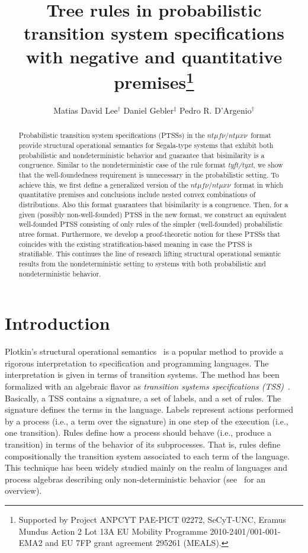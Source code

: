 \documentclass[submission,copyright,creativecommons]{eptcs}
\title{Tree rules in probabilistic transition system specifications with negative and quantitative premises\thanks{Supported by Project ANPCYT PAE-PICT 02272, SeCyT-UNC, 
                 Eramus Mundus Action 2 Lot 13A EU Mobility Programme 2010-2401/001-001-EMA2 and EU 7FP grant agreement 295261 (MEALS).}}
\author{
Matias David Lee$^\dag$  \qquad\qquad
Daniel Gebler$^\ddag$  \qquad\qquad
Pedro R. D'Argenio$^\dag$
\and
\institute{$^\dag$FaMAF -- CONICET \\Universidad Nacional de C\'ordoba\\Ciudad Universitaria, X5000HUA C\'ordoba \\ Argentina}
\email{\{lee,dargenio\}@famaf.unc.edu.ar}
\and
\institute{$^\ddag$Department of Computer Science\\VU University Amsterdam \\ De Boelelaan 1081a, 1081HV Amsterdam \\ The Netherlands}
\email{e.d.gebler@vu.nl}
\ifdraft
\and\institute{\wipinfo}
\fi
}
\newcommand{\ntmufnu}{\ensuremath{\textit{nt}\mu\textit{f}\nu}}
\newcommand{\ntmuxnu}{\ensuremath{\textit{nt}\mu\textit{x}\nu}}
\newcommand{\ntmufxnu}{\ensuremath{\ntmufnu\textit{/}\ntmuxnu}}
\begin{document}
\maketitle

\begin{abstract}
Probabilistic transition system specifications (PTSSs) in the
\ntmufxnu\ format provide structural operational semantics for
Segala-type systems that exhibit both probabilistic and
nondeterministic behavior and guarantee that bisimilarity is a
congruence.
Similar to the nondeterministic case of the rule format {\it tyft/tyxt}, we
show that the well-foundedness requirement is unnecessary in the
probabilistic setting.
To achieve this, we first define a generalized version of the
\ntmufxnu\ format in which quantitative premises and conclusions
include nested convex combinations of distributions.  
Also this format guarantees that bisimilarity
is a congruence.
Then, for a given (possibly non-well-founded) PTSS in the new format,
we construct an equivalent well-founded PTSS consisting
of only rules of the simpler (well-founded) probabilistic ntree
format.
Furthermore, we develop a proof-theoretic
notion for these PTSSs that coincides with the existing stratification-based meaning
in case the PTSS is stratifiable. This
continues the line of research lifting structural operational semantic
results from the nondeterministic setting to systems with both
probabilistic and nondeterministic behavior.
\end{abstract}

\section{Introduction}


Plotkin's structural operational semantics~\cite{Plotkin81} is a
popular method to provide 
a rigorous interpretation to specification and programming languages. The interpretation 
is given in terms of transition systems.
The method has been formalized with an algebraic flavor as \emph{transition
  systems specifications
  (TSS)}~\cite[etc.]{GrooteVaandrager92,BloomIM95:jacm,Groote93,BolGroote96}.
Basically, a TSS contains a signature, a set of labels, and a set of
rules. The signature defines the terms in the language.  Labels
represent actions performed by a process (i.e., a term over the
signature) in one step of the execution (i.e., one transition).
Rules define how a process should behave (i.e., produce a transition)
in terms of the behavior of its subprocesses. 
That is, rules define
compositionally the transition system associated to each term of the
language.
This technique has been widely studied mainly on the realm of
languages and process algebras describing only non-deterministic
behavior (see~\cite{MousaviEtAl07} for an overview).
\end{document}
